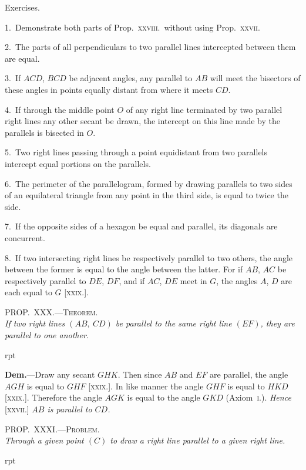 \documentclass[oneside]{book}
\newcommand\myprop[2]{
\bigskip\Needspace*{4\baselineskip}\begin{center}\textsc{#1}\\\medskip\emph{#2}\par\end{center}
}
\newcommand\exhead[1]{
\Needspace*{5\baselineskip}\begin{center}
\textsf{#1}
\end{center}
}
\newcommand\imgflow[3]{
\setcounter{wrapwidth}{#1}
\begin{wrapfigure}[#2]{r}{\value{wrapwidth}pt}
\begin{center}
\vspace{-0.3in}
\end{center}
\end{wrapfigure}
}
\begin{document}
\exhead{Exercises.}

\begin{footnotesize}
1.~Demonstrate both parts of Prop.\ \textsc{xxviii.}\ without using Prop.\
\textsc{xxvii}.

2.~The parts of all perpendiculars to two parallel lines intercepted
between them are equal.

3.~If $ACD$, $BCD$ be adjacent angles, any parallel to $AB$ will
meet the bisectors of these angles in points equally distant from
where it meets $CD$.


4.~If through the middle point $O$ of any right line terminated
by two parallel right lines any other secant be drawn, the intercept
on this line made by the parallels is bisected in $O$.

5.~Two right lines passing through a point equidistant from
two parallels intercept equal portions on the parallels.

6.~The perimeter of the parallelogram, formed by drawing
parallels to two sides of an equilateral triangle from any point in
the third side, is equal to twice the side.

7.~If the opposite sides of a hexagon be equal and parallel, its
diagonals are concurrent.

8.~If two intersecting right lines be respectively parallel to two
others, the angle between the former is equal to the angle between
the latter. For if $AB$, $AC$ be respectively parallel to $DE$,
$DF$, and if $AC$, $DE$ meet in $G$, the angles $A$, $D$ are each equal to
$G$ [\textsc{xxix}.].
\par\end{footnotesize}


\myprop{PROP\@.~XXX\@.---Theorem.}{If two right lines $(AB,\ CD)$ be parallel to the same right
line $(EF)$, they are parallel to one another.}

\imgflow{125}{7}{f050}

\textbf{Dem.}---Draw any secant
$GHK$. Then since $AB$ and
$EF$ are parallel, the angle $AGH$
is equal to $GHF$ [\textsc{xxix}.]. In like
manner the angle $GHF$ is equal
to $HKD$ [\textsc{xxix}.]. Therefore the
angle $AGK$ is equal to the
angle $GKD$ (Axiom~\textsc{i}.). \textit{Hence }
[\textsc{xxvii}.] \textit{$AB$ is parallel to $CD$.}


\myprop{PROP\@.~XXXI\@.---Problem.}{Through a given point $(C)$ to draw a right line parallel
to a given right line.}

\imgflow{125}{5}{f051}
\end{document}
